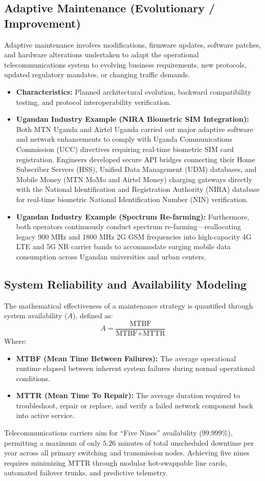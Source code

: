 \documentclass[12pt,a4paper]{report}
\begin{document}
\subsection{Adaptive Maintenance (Evolutionary / Improvement)}
Adaptive maintenance involves modifications, firmware updates, software patches, and hardware alterations undertaken to adapt the operational telecommunications system to evolving business requirements, new protocols, updated regulatory mandates, or changing traffic demands.
\begin{itemize}
    \item \textbf{Characteristics:} Planned architectural evolution, backward compatibility testing, and protocol interoperability verification.
    \item \textbf{Ugandan Industry Example (NIRA Biometric SIM Integration):} Both MTN Uganda and Airtel Uganda carried out major adaptive software and network enhancements to comply with Uganda Communications Commission (UCC) directives requiring real-time biometric SIM card registration. Engineers developed secure API bridges connecting their Home Subscriber Servers (HSS), Unified Data Management (UDM) databases, and Mobile Money (MTN MoMo and Airtel Money) charging gateways directly with the National Identification and Registration Authority (NIRA) database for real-time biometric National Identification Number (NIN) verification.
    \item \textbf{Ugandan Industry Example (Spectrum Re-farming):} Furthermore, both operators continuously conduct spectrum re-farming---reallocating legacy 900 MHz and 1800 MHz 2G GSM frequencies into high-capacity 4G LTE and 5G NR carrier bands to accommodate surging mobile data consumption across Ugandan universities and urban centers.
\end{itemize}

\subsection{System Reliability and Availability Modeling}
The mathematical effectiveness of a maintenance strategy is quantified through system availability ($A$), defined as:
\[ A = \frac{\text{MTBF}}{\text{MTBF} + \text{MTTR}} \]
Where:
\begin{itemize}
    \item \textbf{MTBF (Mean Time Between Failures):} The average operational runtime elapsed between inherent system failures during normal operational conditions.
    \item \textbf{MTTR (Mean Time To Repair):} The average duration required to troubleshoot, repair or replace, and verify a failed network component back into active service.
\end{itemize}
Telecommunications carriers aim for ``Five Nines'' availability ($99.999\%$), permitting a maximum of only $5.26\text{ minutes}$ of total unscheduled downtime per year across all primary switching and transmission nodes. Achieving five nines requires minimizing MTTR through modular hot-swappable line cards, automated failover trunks, and predictive telemetry.
\end{document}
